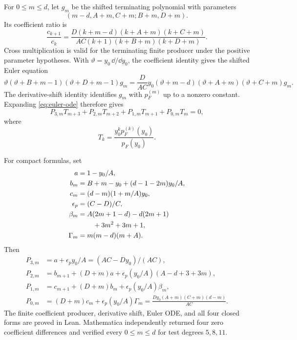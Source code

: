 \documentclass[12pt]{article}
\begin{document}
For $0\le m\le d$, let $g_m$ be the shifted terminating polynomial with
parameters
\[
 (m-d,A+m,C+m;B+m,D+m).
\]
Its coefficient ratio is
\begin{equation}\label{eq:coefficient-ratio}
 \frac{c_{k+1}}{c_k}
 =\frac{D(k+m-d)(k+A+m)(k+C+m)}
 {AC(k+1)(k+B+m)(k+D+m)}.
\end{equation}
Cross multiplication is valid for the terminating finite producer under the
positive parameter hypotheses.  With $\vartheta=y_0\,\dd/\dd y_0$, the
coefficient identity gives the shifted Euler equation
\begin{equation}\label{eq:euler-ode}
 \vartheta(\vartheta+B+m-1)(\vartheta+D+m-1)g_m
 =\frac{D}{AC}y_0
 (\vartheta+m-d)(\vartheta+A+m)(\vartheta+C+m)g_m.
\end{equation}
The derivative-shift identity identifies $g_m$ with $p_F^{(m)}$ up to a
nonzero constant.  Expanding \eqref{eq:euler-ode} therefore gives
\begin{equation}\label{eq:four-term}
 P_{3,m}T_{m+3}+P_{2,m}T_{m+2}
 +P_{1,m}T_{m+1}+P_{0,m}T_m=0,
\end{equation}
where
\begin{equation}\label{eq:Tk}
 T_k=\frac{y_0^kp_F^{(k)}(y_0)}{p_F(y_0)}.
\end{equation}

For compact formulas, set
\begin{align*}
 a&=1-y_0/A,\\
 b_m&=B+m-y_0+(d-1-2m)y_0/A,\\
 c_m&=(d-m)(1+m/A)y_0,\\
 \epsilon_p&=(C-D)/C,\\
 \beta_m&=A(2m+1-d)-d(2m+1)\\
 &\hspace{2.2em}+3m^2+3m+1,\\
 \Gamma_m&=m(m-d)(m+A).
\end{align*}
Then
\begin{align}
 P_{3,m}&=a+\epsilon_p y_0/A=(AC-Dy_0)/(AC),\nonumber\\
 P_{2,m}&=b_{m+1}+(D+m)a
 +\epsilon_p(y_0/A)(A-d+3+3m),\nonumber\\
 P_{1,m}&=c_{m+1}+(D+m)b_m+\epsilon_p(y_0/A)\beta_m,
 \label{eq:Pcoeffs}\\
 P_{0,m}&=(D+m)c_m+\epsilon_p(y_0/A)\Gamma_m
 =\frac{Dy_0(A+m)(C+m)(d-m)}{AC}.\nonumber
\end{align}
The finite coefficient producer, derivative shift, Euler ODE, and all four
closed forms are proved in Lean.  Mathematica independently returned four
zero coefficient differences and verified every $0\le m\le d$ for test
degrees $5,8,11$.
\end{document}
